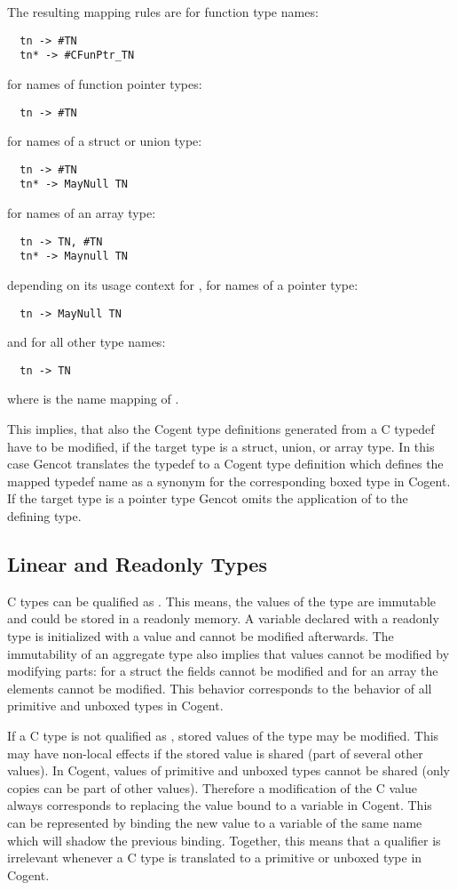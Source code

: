 The resulting mapping rules are for function type names:
\begin{verbatim}
  tn -> #TN
  tn* -> #CFunPtr_TN
\end{verbatim}
for names of function pointer types:
\begin{verbatim}
  tn -> #TN
\end{verbatim}
for names of a struct or union type:
\begin{verbatim}
  tn -> #TN
  tn* -> MayNull TN
\end{verbatim}
for names of an array type:
\begin{verbatim}
  tn -> TN, #TN
  tn* -> Maynull TN
\end{verbatim}
depending on its usage context for , 
for names of a pointer type:
\begin{verbatim}
  tn -> MayNull TN
\end{verbatim}
and for all other type names:
\begin{verbatim}
  tn -> TN
\end{verbatim}
where  is the name mapping of .

This implies, that also the Cogent type definitions generated from a C typedef have to be modified, if
the target type is a struct, union, or array type. In this case Gencot translates the typedef 
to a Cogent type definition which defines the mapped typedef name as a synonym 
for the corresponding boxed type in Cogent. If the target type is a pointer type Gencot omits the 
application of  to the defining type.

\subsection{Linear and Readonly Types}
\label{design-types-readonly}

C types can be qualified as . This means, the values of the type are immutable and could be stored in 
a readonly memory. A variable declared with a readonly type is initialized with a value and cannot be modified 
afterwards. The immutability of an aggregate type also implies that values cannot be modified by modifying parts: 
for a struct the fields cannot be modified and for an array the elements cannot be modified. This behavior corresponds 
to the behavior of all primitive and unboxed types in Cogent. 

If a C type is not qualified as , stored values of the type may be modified. This may have non-local
effects if the stored value is shared (part of several other values). In Cogent, values of primitive and unboxed types
cannot be shared (only copies can be part of other values). Therefore a modification of the C value always corresponds to
replacing the value bound to a variable in Cogent. This can be represented by binding the new value to a variable
of the same name which will shadow the previous binding. Together, this means that a  qualifier is
irrelevant whenever a C type is translated to a primitive or unboxed type in Cogent.

